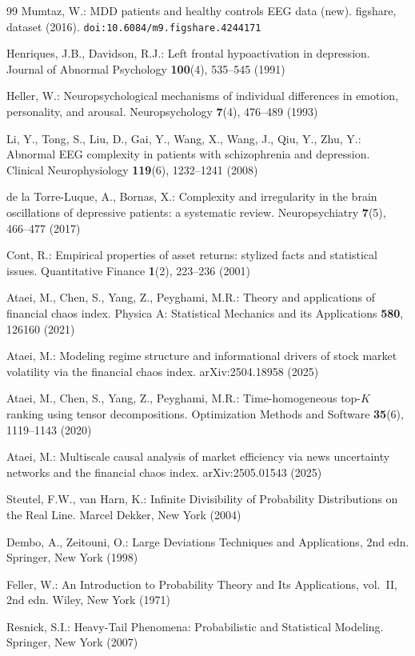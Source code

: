 \documentclass[sn-mathphys-num]{sn-jnl}\newcommand{\SNJNL}{}
\theoremstyle{thmstyleone}
\theoremstyle{thmstyletwo}
\theoremstyle{thmstylethree}
\theoremstyle{thmstyleone}
\begin{document}
\begin{thebibliography}{99}
		Mumtaz, W.: MDD patients and healthy controls EEG data (new).
		figshare, dataset (2016). \texttt{doi:10.6084/m9.figshare.4244171}
		
		Henriques, J.B., Davidson, R.J.: Left frontal hypoactivation in
		depression. Journal of Abnormal Psychology \textbf{100}(4), 535--545
		(1991)
		
		Heller, W.: Neuropsychological mechanisms of individual differences
		in emotion, personality, and arousal. Neuropsychology \textbf{7}(4),
		476--489 (1993)
		
		Li, Y., Tong, S., Liu, D., Gai, Y., Wang, X., Wang, J., Qiu, Y.,
		Zhu, Y.: Abnormal EEG complexity in patients with schizophrenia and
		depression. Clinical Neurophysiology \textbf{119}(6), 1232--1241
		(2008)
		
		de la Torre-Luque, A., Bornas, X.: Complexity and irregularity in
		the brain oscillations of depressive patients: a systematic review.
		Neuropsychiatry \textbf{7}(5), 466--477 (2017)
		
		Cont, R.: Empirical properties of asset returns: stylized facts and
		statistical issues. Quantitative Finance \textbf{1}(2), 223--236
		(2001)
		
		Ataei, M., Chen, S., Yang, Z., Peyghami, M.R.: Theory and
		applications of financial chaos index. Physica A: Statistical
		Mechanics and its Applications \textbf{580}, 126160 (2021)
		
		Ataei, M.: Modeling regime structure and informational drivers of
		stock market volatility via the financial chaos index.
		arXiv:2504.18958 (2025)
		
		Ataei, M., Chen, S., Yang, Z., Peyghami, M.R.:
		Time-homogeneous top-$K$ ranking using tensor decompositions.
		Optimization Methods and Software \textbf{35}(6), 1119--1143 (2020)
		
		Ataei, M.: Multiscale causal analysis of market efficiency via news
		uncertainty networks and the financial chaos index.
		arXiv:2505.01543 (2025)
		
		Steutel, F.W., van Harn, K.: Infinite Divisibility of Probability
		Distributions on the Real Line. Marcel Dekker, New York (2004)
		
		Dembo, A., Zeitouni, O.: Large Deviations Techniques and
		Applications, 2nd edn. Springer, New York (1998)
		
		Feller, W.: An Introduction to Probability Theory and Its
		Applications, vol.~II, 2nd edn. Wiley, New York (1971)
		
		Resnick, S.I.: Heavy-Tail Phenomena: Probabilistic and Statistical
		Modeling. Springer, New York (2007)
		
	\end{thebibliography}
	
\end{document}
